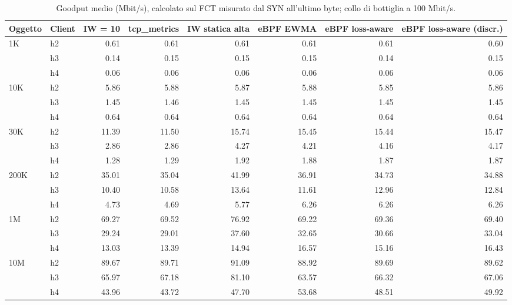 \begin{table}[htbp]
  \centering
  \caption{Goodput medio (Mbit/s), calcolato sul FCT misurato dal SYN all'ultimo byte; collo di bottiglia a 100 Mbit/s.}
  \label{tab:goodput-100}
  \begin{tabular}{llrrrrrr}
    \toprule
    Oggetto & Client & IW = 10 & tcp\_metrics & IW statica alta & eBPF EWMA & eBPF loss-aware & eBPF loss-aware (discr.) \\
    \midrule
    1K & h2 & 0.61 & 0.61 & 0.61 & 0.61 & 0.61 & 0.60 \\
     & h3 & 0.14 & 0.15 & 0.15 & 0.15 & 0.14 & 0.15 \\
     & h4 & 0.06 & 0.06 & 0.06 & 0.06 & 0.06 & 0.06 \\
    \addlinespace
    10K & h2 & 5.86 & 5.88 & 5.87 & 5.88 & 5.85 & 5.86 \\
     & h3 & 1.45 & 1.46 & 1.45 & 1.45 & 1.45 & 1.45 \\
     & h4 & 0.64 & 0.64 & 0.64 & 0.64 & 0.64 & 0.64 \\
    \addlinespace
    30K & h2 & 11.39 & 11.50 & 15.74 & 15.45 & 15.44 & 15.47 \\
     & h3 & 2.86 & 2.86 & 4.27 & 4.21 & 4.16 & 4.17 \\
     & h4 & 1.28 & 1.29 & 1.92 & 1.88 & 1.87 & 1.87 \\
    \addlinespace
    200K & h2 & 35.01 & 35.04 & 41.99 & 36.91 & 34.73 & 34.88 \\
     & h3 & 10.40 & 10.58 & 13.64 & 11.61 & 12.96 & 12.84 \\
     & h4 & 4.73 & 4.69 & 5.77 & 6.26 & 6.26 & 6.26 \\
    \addlinespace
    1M & h2 & 69.27 & 69.52 & 76.92 & 69.22 & 69.36 & 69.40 \\
     & h3 & 29.24 & 29.01 & 37.60 & 32.65 & 30.66 & 33.04 \\
     & h4 & 13.03 & 13.39 & 14.94 & 16.57 & 15.16 & 16.43 \\
    \addlinespace
    10M & h2 & 89.67 & 89.71 & 91.09 & 88.92 & 89.69 & 89.62 \\
     & h3 & 65.97 & 67.18 & 81.10 & 63.57 & 66.32 & 67.06 \\
     & h4 & 43.96 & 43.72 & 47.70 & 53.68 & 48.51 & 49.92 \\
    \bottomrule
  \end{tabular}
\end{table}
